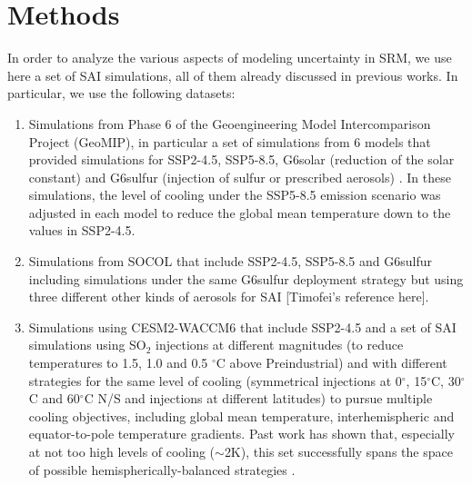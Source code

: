 \documentclass[acp, manuscript]{copernicus}
\newcommand{\tcr}{\textcolor{red}}
\begin{document}

\section{Methods}

In order to analyze the various aspects of modeling uncertainty in SRM, we use here a set of SAI simulations, all of them already discussed in previous works. In particular, we use the following datasets:

\begin{enumerate}
    \item Simulations from Phase 6 of the Geoengineering Model Intercomparison Project (GeoMIP), in particular a set of simulations from 6 models that provided simulations for SSP2-4.5, SSP5-8.5, G6solar (reduction of the solar constant) and G6sulfur (injection of sulfur or prescribed aerosols) \citep{Visioni2021}. In these simulations, the level of cooling under the SSP5-8.5 emission scenario was adjusted in each model to reduce the global mean temperature down to the values in SSP2-4.5.
    \item Simulations from SOCOL that include SSP2-4.5, SSP5-8.5 and G6sulfur including simulations under the same G6sulfur deployment strategy but using three different other kinds of aerosols for SAI [Timofei's reference here].
    \item Simulations using CESM2-WACCM6 that include SSP2-4.5 and a set of SAI simulations using SO$_2$ injections at different magnitudes (to reduce temperatures to 1.5, 1.0 and 0.5 $^\circ$C above Preindustrial) and with different strategies for the same level of cooling (symmetrical injections at 0$^\circ$, 15$^\circ$C, 30$^\circ$C and 60$^\circ$C N/S and injections at different latitudes) to pursue multiple cooling objectives, including global mean temperature, interhemispheric and equator-to-pole temperature gradients. Past work has shown that, especially at not too high levels of cooling ($\sim$2K), this set successfully spans the space of possible hemispherically-balanced strategies \citep{zhang_how_2022}.
\end{enumerate}
\end{document}
